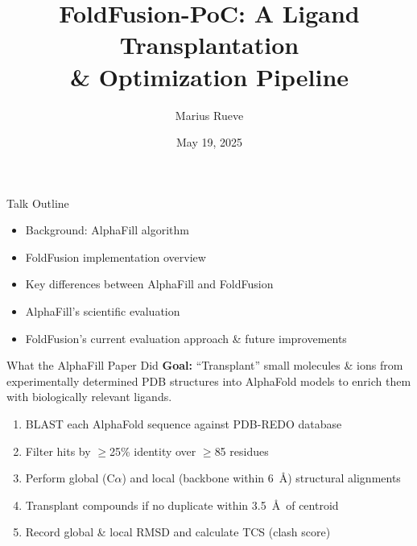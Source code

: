 \documentclass[aspectratio=169]{beamer}
\title{FoldFusion-PoC: A Ligand Transplantation \\ \& Optimization Pipeline}
\author{Marius Rueve}
\date{May 19, 2025}
\begin{document}
\begin{frame}
    \titlepage
\end{frame}

\begin{frame}{Talk Outline}
    \begin{itemize}
        \item Background: AlphaFill algorithm
        \item FoldFusion implementation overview
        \item Key differences between AlphaFill and FoldFusion
        \item AlphaFill's scientific evaluation
        \item FoldFusion's current evaluation approach \& future improvements
    \end{itemize}
\end{frame}

\begin{frame}{What the AlphaFill Paper Did}
    \textbf{Goal:} “Transplant” small molecules \& ions from experimentally determined PDB structures into AlphaFold models to enrich them with biologically relevant ligands.
    \begin{enumerate}
        \item BLAST each AlphaFold sequence against PDB-REDO database
        \item Filter hits by $\geq$25\% identity over $\geq$85 residues
        \item Perform global (C$\alpha$) and local (backbone within 6~\AA) structural alignments
        \item Transplant compounds if no duplicate within 3.5~\AA~of centroid
        \item Record global \& local RMSD and calculate TCS (clash score)
    \end{enumerate}
\end{frame}
\end{document}
